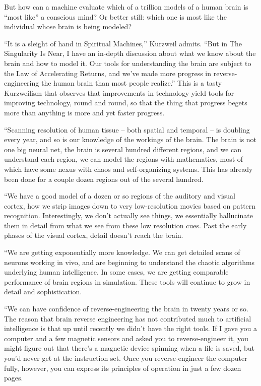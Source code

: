 But how can a machine evaluate which of a trillion models of a
human brain is ``most like'' a conscious mind? Or better still: which
one is most like the individual whose brain is being modeled?

``It is a sleight of hand in Spiritual Machines,'' Kurzweil admits.
``But in The Singularity Is Near, I have an in-depth discussion
about what we know about the brain and how to model it. Our tools
for understanding the brain are subject to the Law of Accelerating
Returns, and we've made more progress in reverse-engineering the
human brain than most people realize.'' This is a tasty Kurzweilism
that observes that improvements in technology yield tools for
improving technology, round and round, so that the thing that
progress begets more than anything is more and yet faster
progress.

``Scanning resolution of human tissue -- both spatial and temporal
-- is doubling every year, and so is our knowledge of the workings
of the brain. The brain is not one big neural net, the brain is
several hundred different regions, and we can understand each
region, we can model the regions with mathematics, most of which
have some nexus with chaos and self-organizing systems. This has
already been done for a couple dozen regions out of the several
hundred.

``We have a good model of a dozen or so regions of the auditory and
visual cortex, how we strip images down to very low-resolution
movies based on pattern recognition. Interestingly, we don't
actually see things, we essentially hallucinate them in detail from
what we see from these low resolution cues. Past the early phases
of the visual cortex, detail doesn't reach the brain.

``We are getting exponentially more knowledge. We can get detailed
scans of neurons working in vivo, and are beginning to understand
the chaotic algorithms underlying human intelligence. In some
cases, we are getting comparable performance of brain regions in
simulation. These tools will continue to grow in detail and
sophistication.

``We can have confidence of reverse-engineering the brain in twenty
years or so. The reason that brain reverse engineering has not
contributed much to artificial intelligence is that up until
recently we didn't have the right tools. If I gave you a computer
and a few magnetic sensors and asked you to reverse-engineer it,
you might figure out that there's a magnetic device spinning when a
file is saved, but you'd never get at the instruction set. Once you
reverse-engineer the computer fully, however, you can express its
principles of operation in just a few dozen pages.

